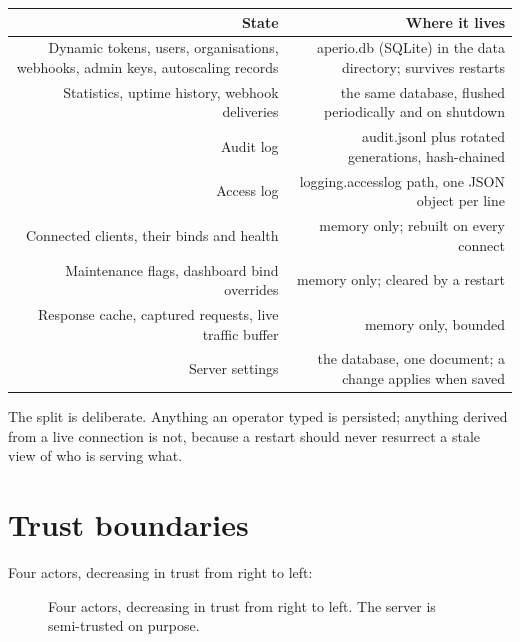 \documentclass[11pt,a4paper,oneside]{book}
\newcommand{\aperiobreakableunderscore}{\textunderscore\allowbreak}
\newcommand{\aperiocodebreaks}{\XeTeXinterchartokenstate=1 }
\newcommand{\aperiocodebreaks}{}
\DeclareRobustCommand{\code}[1]{{\ttfamily\small\aperiocodebreaks
  \let\_\aperiobreakableunderscore#1}}
\begin{document}
\begin{longtable}{@{}R{0.30}R{0.64}@{}}
\toprule
\textbf{State} & \textbf{Where it lives} \\
\midrule
\endhead
Dynamic tokens, users, organisations, webhooks, admin keys, autoscaling
records & \code{aperio.db} (SQLite) in the data directory; survives
restarts \\
Statistics, uptime history, webhook deliveries & the same database,
flushed periodically and on shutdown \\
Audit log & \code{audit.jsonl} plus rotated generations, hash-chained \\
Access log & \code{logging.access\_log} path, one JSON object per line \\
Connected clients, their binds and health & memory only; rebuilt on
every connect \\
Maintenance flags, dashboard bind overrides & memory only; cleared by a
restart \\
Response cache, captured requests, live traffic buffer & memory only,
bounded \\
Server settings & the database, one document; a
change applies when saved \\
\bottomrule
\end{longtable}

The split is deliberate. Anything an operator typed is persisted;
anything derived from a live connection is not, because a restart should
never resurrect a stale view of who is serving what.

\section{Trust boundaries}

Four actors, decreasing in trust from right to left:

\begin{figure}[htbp]
\centering
{}
\caption{Four actors, decreasing in trust from right to left. The server is
semi-trusted on purpose.}
\end{figure}
\end{document}
